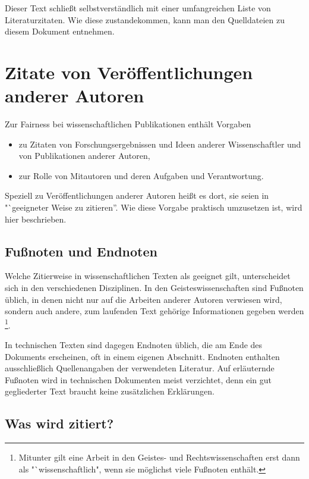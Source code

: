 \documentclass[a4paper, 10pt]{article}
\begin{document}
Dieser Text schlie{\ss}t selbstverst\"andlich mit einer umfangreichen Liste von
Literaturzitaten. Wie diese zustandekommen, kann man den Quelldateien zu diesem
Dokument entnehmen.


\section{Zitate von Ver\"offentlichungen anderer Autoren}

Zur Fairness bei wissenschaftlichen Publikationen enth\"alt \cite[\S4]{FAU:wiss-Prax:2002} Vorgaben 
\begin{itemize}
 \item 
zu Zitaten von Forschungsergebnissen und Ideen anderer Wissenschaftler und von
Publikationen anderer Autoren,
\item
zur Rolle von Mitautoren und deren Aufgaben und Verantwortung.
\end{itemize}
Speziell zu Ver\"offentlichungen anderer Autoren hei{\ss}t es dort, sie seien in "`geeigneter Weise zu zitieren''\cite[\S4(1)1]{FAU:wiss-Prax:2002}. Wie diese Vorgabe praktisch umzusetzen ist, wird hier beschrieben.

 \subsection{Fu{\ss}noten und Endnoten}

Welche Zitierweise in wissenschaftlichen Texten als geeignet gilt, unterscheidet
sich in den verschiedenen Disziplinen. In den Geisteswissenschaften sind
Fu{\ss}noten \"ublich, in denen nicht nur auf die Arbeiten anderer Autoren
verwiesen wird, sondern auch andere, zum laufenden Text geh\"orige Informationen
gegeben werden%
\footnote{Mitunter gilt eine Arbeit in den Geistes- und Rechtswissenschaften erst dann als "`wissenschaftlich", wenn sie m\"oglichst viele Fu{\ss}noten enth\"alt.}.

In technischen Texten sind dagegen Endnoten \"ublich, die am Ende des Dokuments erscheinen, oft in einem eigenen Abschnitt. Endnoten enthalten ausschlie{\ss}lich Quellenangaben der verwendeten Literatur. Auf erl\"auternde Fu{\ss}noten wird in technischen Dokumenten meist verzichtet, denn ein gut gegliederter Text braucht keine zus\"atzlichen Erkl\"arungen.

\subsection{Was wird zitiert?}
\end{document}
